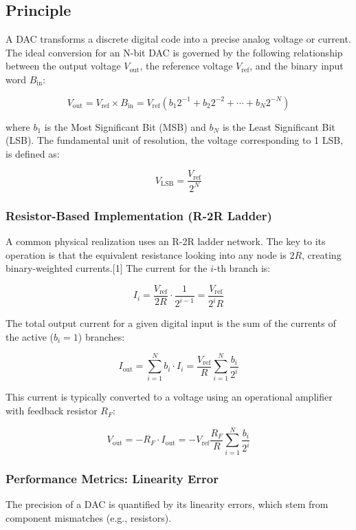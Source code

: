 \documentclass[conference]{IEEEtran}
\begin{document}
\subsection{Principle}
A DAC transforms a discrete digital code into a precise analog voltage or current. The ideal conversion for an N-bit DAC is governed by the following relationship between the output voltage \( V_{\text{out}} \), the reference voltage \( V_{\text{ref}} \), and the binary input word \( B_{\text{in}} \):

\[
V_{\text{out}} = V_{\text{ref}} \times B_{\text{in}} = V_{\text{ref}} \left( b_1 2^{-1} + b_2 2^{-2} + \cdots + b_N 2^{-N} \right)
\]

where \( b_1 \) is the Most Significant Bit (MSB) and \( b_N \) is the Least Significant Bit (LSB). The fundamental unit of resolution, the voltage corresponding to 1 LSB, is defined as:

\[
V_{\text{LSB}} = \frac{V_{\text{ref}}}{2^N}
\]

\subsubsection{Resistor-Based Implementation (R-2R Ladder)}

A common physical realization uses an R-2R ladder network. The key to its operation is that the equivalent resistance looking into any node is \( 2R \), creating binary-weighted currents.[1] The current for the \( i \)-th branch is:

\[
I_i = \frac{V_{\text{ref}}}{2R} \cdot \frac{1}{2^{i-1}} = \frac{V_{\text{ref}}}{2^i R}
\]

The total output current for a given digital input is the sum of the currents of the active (\( b_i = 1 \)) branches:

\[
I_{\text{out}} = \sum_{i=1}^{N} b_i \cdot I_i = \frac{V_{\text{ref}}}{R} \sum_{i=1}^{N} \frac{b_i}{2^i}
\]

This current is typically converted to a voltage using an operational amplifier with feedback resistor \( R_F \):

\[
V_{\text{out}} = - R_F \cdot I_{\text{out}} = - V_{\text{ref}} \frac{R_F}{R} \sum_{i=1}^{N} \frac{b_i}{2^i}
\]

\subsubsection{Performance Metrics: Linearity Error}

The precision of a DAC is quantified by its linearity errors, which stem from component mismatches (e.g., resistors).
\end{document}
